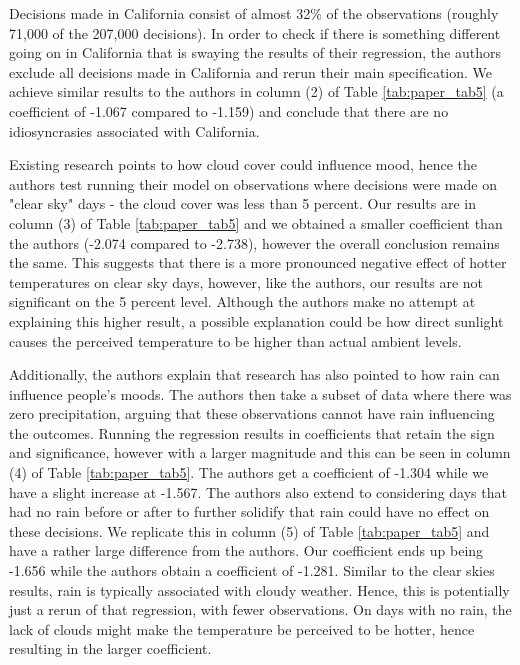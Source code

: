 \documentclass{article}
\begin{document}
	Decisions made in California consist of almost 32\% of the observations (roughly 71,000 of the 207,000 decisions). In order to check if there is something different going on in California that is swaying the results of their regression, the authors exclude all decisions made in California and rerun their main specification. We achieve similar results to the authors in column (2) of Table \ref{tab:paper_tab5} (a coefficient of -1.067 compared to -1.159) and conclude that there are no idiosyncrasies associated with California.
	
	Existing research points to how cloud cover could influence mood, hence the authors test running their model on observations where decisions were made on "clear sky" days - the cloud cover was less than 5 percent. Our results are in column (3) of Table \ref{tab:paper_tab5} and we obtained a smaller coefficient than the authors (-2.074 compared to -2.738), however the overall conclusion remains the same. This suggests that there is a more pronounced negative effect of hotter temperatures on clear sky days, however, like the authors, our results are not significant on the 5 percent level. Although the authors make no attempt at explaining this higher result, a possible explanation could be how direct sunlight causes the perceived temperature to be higher than actual ambient levels.
	
	Additionally, the authors explain that research has also pointed to how rain can influence people's moods. The authors then take a subset of data where there was zero precipitation, arguing that these observations cannot have rain influencing the outcomes. Running the regression results in coefficients that retain the sign and significance, however with a larger magnitude and this can be seen in column (4) of Table \ref{tab:paper_tab5}. The authors get a coefficient of -1.304 while we have a slight increase at -1.567. The authors also extend to considering days that had no rain before or after to further solidify that rain could have no effect on these decisions. We replicate this in column (5) of Table \ref{tab:paper_tab5} and have a rather large difference from the authors. Our coefficient ends up being -1.656 while the authors obtain a coefficient of -1.281. Similar to the clear skies results, rain is typically associated with cloudy weather. Hence, this is potentially just a rerun of that regression, with fewer observations. On days with no rain, the lack of clouds might make the temperature be perceived to be hotter, hence resulting in the larger coefficient.  
	
\end{document}
